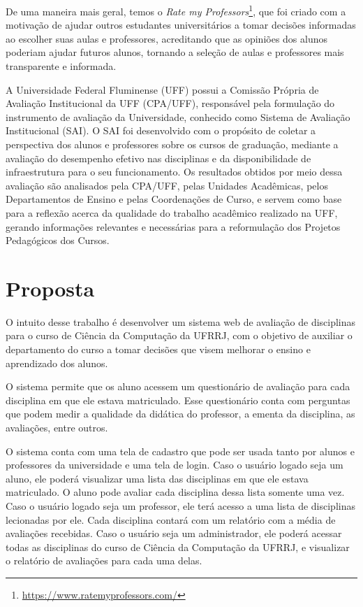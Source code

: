 De uma maneira mais geral, temos o \textit{Rate my Professors}\footnote{\url{https://www.ratemyprofessors.com/}}, que foi criado
com a motivação de ajudar outros estudantes universitários a tomar decisões informadas ao escolher suas aulas e professores, acreditando que as opiniões dos alunos poderiam ajudar futuros alunos, tornando a seleção de aulas e professores mais transparente e informada.

A Universidade Federal Fluminense (UFF) possui a Comissão Própria de Avaliação Institucional da UFF (CPA/UFF),
responsável pela formulação do instrumento de avaliação da Universidade, conhecido como Sistema de Avaliação Institucional (SAI).
O SAI foi desenvolvido com o propósito de coletar a perspectiva dos alunos e professores sobre os cursos de graduação,
mediante a avaliação do desempenho efetivo nas disciplinas e da disponibilidade de infraestrutura para o seu funcionamento.
Os resultados obtidos por meio dessa avaliação são analisados pela CPA/UFF, pelas Unidades Acadêmicas, pelos Departamentos de Ensino e pelas Coordenações de Curso,
e servem como base para a reflexão acerca da qualidade do trabalho acadêmico realizado na UFF, gerando informações relevantes e necessárias para a reformulação dos Projetos Pedagógicos dos Cursos.





\section{Proposta}
O intuito desse trabalho é desenvolver um sistema web de avaliação de disciplinas para o curso de Ciência da Computação da UFRRJ, com o objetivo de auxiliar o departamento do curso a tomar decisões que visem melhorar o ensino e aprendizado dos alunos.

O sistema permite que os aluno acessem um questionário de avaliação para cada disciplina em que ele estava matriculado. Esse questionário conta com perguntas que podem medir a qualidade da didática do professor, a ementa da disciplina, as avaliações, entre outros.

O sistema conta com uma tela de cadastro que pode ser usada tanto por alunos e professores da universidade e uma tela de login. Caso o usuário logado seja um aluno, ele poderá visualizar uma lista das disciplinas em que ele estava matriculado. O aluno pode avaliar cada disciplina dessa lista somente uma vez. Caso o usuário logado seja um professor, ele terá acesso a uma lista de disciplinas lecionadas por ele. Cada disciplina contará com um relatório com a média de avaliações recebidas. Caso o usuário seja um administrador, ele poderá acessar todas as disciplinas do curso de Ciência da Computação da UFRRJ, e visualizar o relatório de avaliações para cada uma delas.

